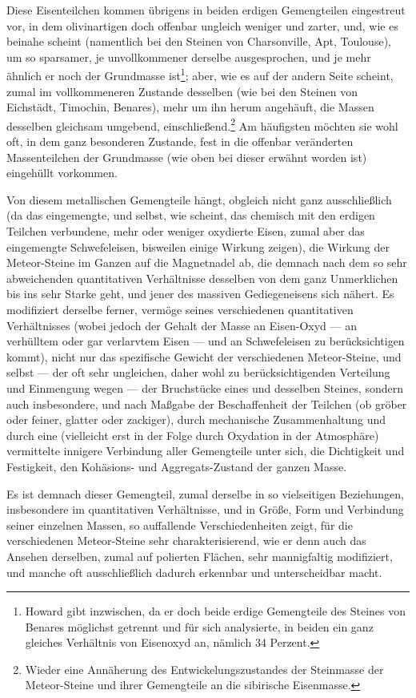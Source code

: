 \documentclass[a4paper, 11pt, oneside, german]{article}
\begin{document}
Diese Eisenteilchen kommen übrigens in beiden erdigen Gemengteilen eingestreut vor, in dem olivinartigen doch offenbar ungleich weniger und zarter, und, wie es beinahe scheint (namentlich bei den Steinen von Charsonville, Apt, Toulouse), um so sparsamer, je unvollkommener derselbe ausgesprochen, und je mehr ähnlich er noch der Grundmasse ist\footnote{Howard gibt inzwischen, da er doch beide erdige Gemengteile des Steines von Benares möglichst getrennt und für sich analysierte, in beiden ein ganz gleiches Verhältnis von Eisenoxyd an, nämlich 34 Perzent.}; aber, wie es auf der andern Seite scheint, zumal im vollkommeneren Zustande desselben (wie bei den Steinen von Eichstädt, Timochin, Benares), mehr um ihn herum angehäuft, die Massen desselben gleichsam umgebend, einschließend.\footnote{Wieder eine Annäherung des Entwickelungszustandes der Steinmasse der Meteor-Steine und ihrer Gemengteile an die sibirische Eisenmasse.} Am häufigsten möchten sie wohl oft, in dem ganz besonderen Zustande, fest in die offenbar veränderten Massenteilchen der Grundmasse (wie oben bei dieser erwähnt worden ist) eingehüllt vorkommen.

Von diesem metallischen Gemengteile hängt, obgleich nicht ganz ausschließlich (da das eingemengte, und selbst, wie scheint, das chemisch mit den erdigen Teilchen verbundene, mehr oder weniger oxydierte Eisen, zumal aber das eingemengte Schwefeleisen, bisweilen einige Wirkung zeigen), die Wirkung der Meteor-Steine im Ganzen auf die Magnetnadel ab, die demnach nach dem so sehr abweichenden quantitativen Verhältnisse desselben von dem ganz Unmerklichen bis ins sehr Starke geht, und jener des massiven Gediegeneisens sich nähert. Es modifiziert derselbe ferner, vermöge seines verschiedenen quantitativen Verhältnisses (wobei jedoch der Gehalt der Masse an Eisen-Oxyd --- an verhülltem oder gar verlarvtem Eisen --- und an Schwefeleisen zu berücksichtigen kommt), nicht nur das spezifische Gewicht der verschiedenen Meteor-Steine, und selbst --- der oft sehr ungleichen, daher wohl zu berücksichtigenden Verteilung und Einmengung wegen --- der Bruchstücke eines und desselben Steines, sondern auch insbesondere, und nach Maßgabe der Beschaffenheit der Teilchen (ob gröber oder feiner, glatter oder zackiger), durch mechanische Zusammenhaltung und durch eine (vielleicht erst in der Folge durch Oxydation in der Atmosphäre) vermittelte innigere Verbindung aller Gemengteile unter sich, die Dichtigkeit und Festigkeit, den Kohäsions- und Aggregats-Zustand der ganzen Masse.

Es ist demnach dieser Gemengteil, zumal derselbe in so vielseitigen Beziehungen, insbesondere im quantitativen Verhältnisse, und in Größe, Form und Verbindung seiner einzelnen Massen, so auffallende Verschiedenheiten zeigt, für die verschiedenen Meteor-Steine sehr charakterisierend, wie er denn auch das Ansehen derselben, zumal auf polierten Flächen, sehr mannigfaltig modifiziert, und manche oft ausschließlich dadurch erkennbar und unterscheidbar macht.
\end{document}
